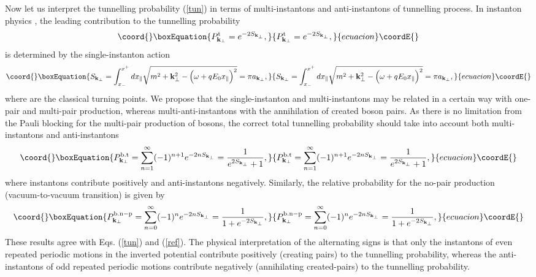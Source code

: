 \documentclass[a4paper,prd,showpacs,preprintnumbers,amsmath,amssymb]{revtex4}
\begin{document}
Now let us interpret the tunnelling probability (\ref{tun}) in
terms of multi-instantons and anti-instantons of tunnelling
process. In instanton physics \cite{col}, the leading contribution
to the tunnelling probability
\begin{equation}\coord{}\boxEquation{
P^{\rm t}_{{\bf k}_{\perp}} = e^{- 2 S_{{\bf k}_{\perp}}},
}{
P^{\rm t}_{{\bf k}_{\perp}} = e^{- 2 S_{{\bf k}_{\perp}}},
}{ecuacion}\coordE{}\end{equation}
is determined by the single-instanton action
\begin{equation}\coord{}\boxEquation{
S_{{\bf k}_{\perp}} = \int_{x_-}^{x^+} dx_{\parallel} \sqrt{m^2 +
{\bf k}_{\perp}^2 - \Bigl( \omega + qE_0 x_{\parallel} \Bigr)^2 }
= \pi  a_{{\bf k}_{\perp}}, \label{inst}
}{
S_{{\bf k}_{\perp}} = \int_{x_-}^{x^+} dx_{\parallel} \sqrt{m^2 +
{\bf k}_{\perp}^2 - \Bigl( \omega + qE_0 x_{\parallel} \Bigr)^2 }
= \pi  a_{{\bf k}_{\perp}}, }{ecuacion}\coordE{}\end{equation}
where \coordHE{} are
the classical turning points. We propose that the single-instanton
and multi-instantons may be related in a certain way with one-pair
and multi-pair production, whereas multi-anti-instantons with the
annihilation of created boson pairs. As there is no limitation
from the Pauli blocking for the multi-pair production of bosons,
the correct total tunnelling probability should take into account
both multi-instantons and anti-instantons
\begin{equation}\coord{}\boxEquation{
P^{\rm b.t}_{{\bf k}_{\perp}} = \sum_{n = 1}^{\infty} (-1)^{n+1}
e^{- 2n S_{{\bf k}_{\perp}}} = \frac{1}{ e^{2S_{{\bf k}_{\perp}}}
+ 1},
}{
P^{\rm b.t}_{{\bf k}_{\perp}} = \sum_{n = 1}^{\infty} (-1)^{n+1}
e^{- 2n S_{{\bf k}_{\perp}}} = \frac{1}{ e^{2S_{{\bf k}_{\perp}}}
+ 1},
}{ecuacion}\coordE{}\end{equation}
where instantons contribute positively and anti-instantons
negatively. Similarly, the relative probability for the no-pair
production (vacuum-to-vacuum transition) is given by
\begin{equation}\coord{}\boxEquation{
P^{\rm b.n-p}_{{\bf k}_{\perp}} =  \sum_{n = 0}^{\infty} (-1)^{n}
e^{- 2n S_{{\bf k}_{\perp}}} = \frac{1}{1 + e^{- 2S_{{\bf
k}_{\perp}}}},
}{
P^{\rm b.n-p}_{{\bf k}_{\perp}} =  \sum_{n = 0}^{\infty} (-1)^{n}
e^{- 2n S_{{\bf k}_{\perp}}} = \frac{1}{1 + e^{- 2S_{{\bf
k}_{\perp}}}},
}{ecuacion}\coordE{}\end{equation}
These results agree with Eqs. (\ref{tun}) and (\ref{ref}). The
physical interpretation of the alternating signs is that only the
instantons of even repeated periodic motions in the inverted
potential contribute positively (creating pairs) to the tunnelling
probability, whereas the anti-instantons of odd repeated periodic
motions contribute negatively (annihilating created-pairs) to the
tunnelling probability.
\end{document}

